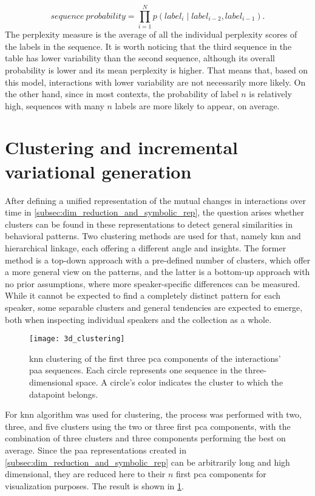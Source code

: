 %
\begin{equation}
	sequence\ probability = \prod_{i=1}^{N} p(label_i \mid label_{i-2}, label_{i-1}).
\end{equation}
\noindent
%
The perplexity measure is the average of all the individual perplexity scores of the labels in the sequence.
It is worth noticing that the third sequence in the table has lower variability than the second sequence, although its overall probability is lower and its mean perplexity is higher.
That means that, based on this model, interactions with lower variability are not necessarily more likely.
On the other hand, since in most contexts, the probability of label $n$ is relatively high, sequences with many $n$ labels are more likely to appear, on average.

\section{Clustering and incremental variational generation}
\label{sec:clustering_and_incremental_generation}

After defining a unified representation of the mutual changes in interactions over time in \cref{subsec:dim_reduction_and_symbolic_rep}, the question arises whether clusters can be found in these representations to detect general similarities in behavioral patterns.
Two clustering methods are used for that, namely \ac{knn} and hierarchical linkage, each offering a different angle and insights.
The former method is a top-down approach with a pre-defined number of clusters, which offer a more general view on the patterns, and the latter is a bottom-up approach with no prior assumptions, where more speaker-specific differences can be measured.
While it cannot be expected to find a completely distinct pattern for each speaker, some separable clusters and general tendencies are expected to emerge, both when inspecting individual speakers and the collection as a whole.
%
\begin{figure}[t]
	\centering
	\texttt{[image: 3d\_clustering]}
	\caption[3D \ac{knn} clustering of mutual changes \acs{pca} components]
		{\ac{knn} clustering of the first three \ac{pca} components of the interactions' \ac{paa} sequences.
		 Each circle represents one sequence in the three-dimensional space.
		 A circle's color indicates the cluster to which the datapoint belongs.}
	\label{fig:knn_clustering}
\end{figure}
%
For \ac{knn} algorithm was used for clustering, the process was performed with two, three, and five clusters using the two or three first \ac{pca} components, with the combination of three clusters and three components performing the best on average.
Since the \ac{paa} representations created in \cref{subsec:dim_reduction_and_symbolic_rep} can be arbitrarily long and high dimensional, they are reduced here to their $n$ first \ac{pca} components for visualization purposes.
The result is shown in \cref{fig:knn_clustering}.

